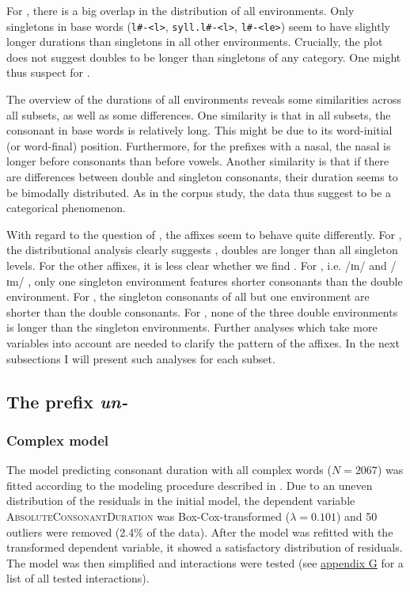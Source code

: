 
For , there is a big overlap in the distribution of all environments. Only singletons in base words (\texttt{l\#-<l>}, \texttt{syll.l\#-<l>}, \texttt{l\#-<le>}) seem to have slightly longer durations than singletons in all other environments. Crucially, the plot does not suggest doubles to be longer than singletons of any category. One might thus suspect  for . 

The overview of the durations of all environments reveals some similarities across all subsets, as well as some differences. 
One similarity is that in all subsets, the consonant in base words is relatively long. This might be due to its word-initial (or word-final) position. 
Furthermore, for the prefixes with a nasal, the nasal is longer before consonants than before vowels. 
Another similarity is that if there are differences between double and singleton consonants, their duration seems to be bimodally distributed. As in the corpus study, the data thus suggest  to be a categorical phenomenon.

With regard to the question of , the affixes seem to behave quite differently. For , the distributional analysis clearly suggests , doubles are longer than all singleton levels. 
For the other affixes, it is less clear whether we find . For , i.e. /ɪn/ and /ɪm/ , only one singleton environment features shorter consonants than the double environment.
For , the singleton consonants of all but one environment are shorter than the double consonants. 
For , none of the three double environments is longer than the singleton environments. Further analyses which take more variables into account are needed to clarify the  pattern of the affixes. 
 In the next subsections I will present such analyses for each subset.


\subsection{The prefix \textit{un-}} \label{un experiment}

\subsubsection{Complex model}


The model predicting consonant duration with all complex words ($N=2067$) was fitted according to the modeling procedure described in . Due to an uneven distribution of the residuals in the initial model, the dependent variable \textsc{AbsoluteConsonantDuration} was Box-Cox-transformed ($\lambda = 0.101$) and 50 outliers were removed (2.4\% of the data).
 After the model was refitted with the transformed dependent variable, it showed a satisfactory distribution of residuals.  The model was then simplified and interactions were tested (see \hyperref[Appendix G Summaries of tested interactions in experimental study]{appendix G} for a list of all tested interactions).
 
